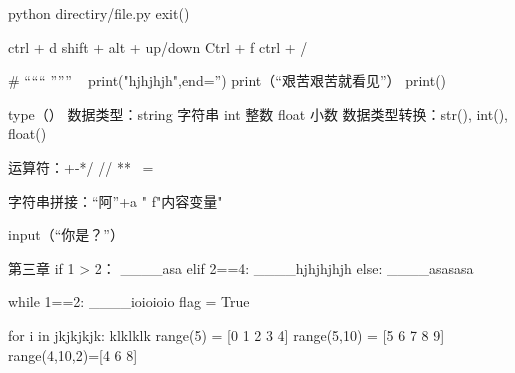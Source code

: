 python directiry/file.py %
exit()  %

ctrl + d %
shift + alt + up/down %
Ctrl + f %
ctrl + / %

#  %
“““     ”””   %
\ %
print("hjhjhjh",end='')  %
print（“艰苦艰苦就看见”）  %
print()  %

type（）  %
数据类型：string 字符串
          int    整数
          float  小数
数据类型转换：str(), int(), float()

运算符：+-*/  // %
              ** %
              ~= %

字符串拼接：“阿”+a 
            "  %
            f"内容{变量}"   %

input（“你是？”）  %


第三章
if 1 > 2：
____asa
elif 2==4:
____hjhjhjhjh
else:
____asasasa

while 1==2:
____ioioioio
flag = True

for i in jkjkjkjk:
    klklklk
range(5) = [0 1 2 3 4]
range(5,10) = [5 6 7 8 9]
range(4,10,2)=[4 6 8]

    

